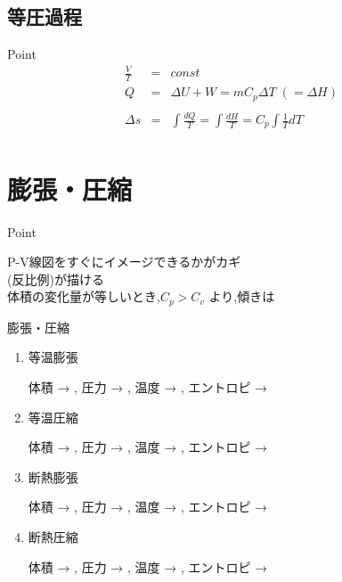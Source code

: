 \documentclass[a4paper]{jsarticle}
\begin{document}
\subsection{等圧過程}
\begin{itembox}[l]{Point}
    \begin{eqnarray*}
        \frac{V}{T}&=&const\\
        Q&=&\Delta U + W = mC_p\Delta T \; \left(= \Delta H\right)\\
        \\
        \Delta s&=&\int \frac{dQ}{T} = \int \frac{dH}{T} = C_p\int\frac{1}{T}dT\\
    \end{eqnarray*}
\end{itembox}
\section{膨張・圧縮}
\begin{itembox}[l]{Point}
    \begin{center}
        P-V線図をすぐにイメージできるかがカギ\\
        (反比例)が描ける\\
        体積の変化量が等しいとき,$C_p > C_v$ より,傾きは \\
    \end{center}
\end{itembox}
\begin{itembox}[l]{膨張・圧縮}
    \begin{enumerate}[(1)]
        \item 等温膨張
              \begin{center}
                  体積 →  , 圧力 →  , 温度 →  , エントロピ → 
              \end{center}
        \item 等温圧縮
              \begin{center}
                  体積 →  , 圧力 →  , 温度 →  , エントロピ → 
              \end{center}
        \item 断熱膨張
              \begin{center}
                  体積 →  , 圧力 →  , 温度 →   , エントロピ → 
              \end{center}
        \item 断熱圧縮
              \begin{center}
                  体積 →  , 圧力 →  , 温度 →   , エントロピ → 
              \end{center}
    \end{enumerate}
\end{itembox}
\end{document}
